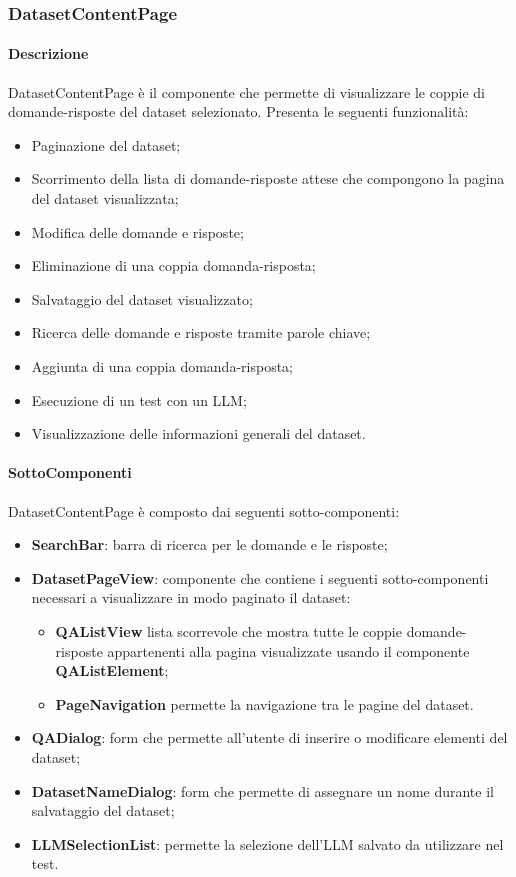 \subsubsection{DatasetContentPage}
\label{sec:DatasetContentPage}
\paragraph{Descrizione}
DatasetContentPage è il componente che permette di visualizzare le coppie di domande-risposte del dataset selezionato. Presenta le seguenti funzionalità:
\begin{itemize}
    \item Paginazione del dataset;
    \item Scorrimento della lista di domande-risposte attese che compongono la pagina del dataset visualizzata;
    \item Modifica delle domande e risposte;
    \item Eliminazione di una coppia domanda-risposta;
    \item Salvataggio del dataset visualizzato;
    \item Ricerca delle domande e risposte tramite parole chiave;
    \item Aggiunta di una coppia domanda-risposta;
    \item Esecuzione di un test con un LLM;
    \item Visualizzazione delle informazioni generali del dataset.
\end{itemize}
\paragraph{SottoComponenti}
DatasetContentPage è composto dai seguenti sotto-componenti:
\begin{itemize}
    \item \textbf{SearchBar}: barra di ricerca per le domande e le risposte;
    \item \textbf{DatasetPageView}: componente che contiene i seguenti sotto-componenti necessari a visualizzare in modo paginato il dataset:
    \begin{itemize}
        \item \textbf{QAListView} lista scorrevole che mostra tutte le coppie domande-risposte appartenenti alla pagina visualizzate usando il componente \textbf{QAListElement};
        \item \textbf{PageNavigation} permette la navigazione tra le pagine del dataset.
    \end{itemize}
    \item \textbf{QADialog}: form che permette all'utente di inserire o modificare elementi del dataset;
    \item \textbf{DatasetNameDialog}: form che permette di assegnare un nome durante il salvataggio del dataset;
    \item \textbf{LLMSelectionList}: permette la selezione dell'LLM salvato da utilizzare nel test.
\end{itemize}

